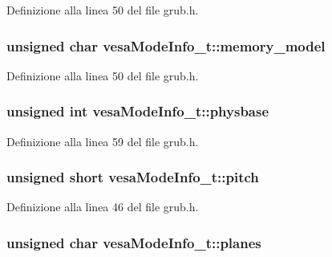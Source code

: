 Definizione alla linea 50 del file grub.\+h.

\hypertarget{structvesaModeInfo__t_a3f6f4827e2c4d40d89a6e8ec6e15c8f4}{
\subsubsection[{memory\+\_\+model}]{\setlength{\rightskip}{0pt plus 5cm}unsigned char vesa\+Mode\+Info\+\_\+t\+::memory\+\_\+model}}\label{structvesaModeInfo__t_a3f6f4827e2c4d40d89a6e8ec6e15c8f4}


Definizione alla linea 50 del file grub.\+h.

\hypertarget{structvesaModeInfo__t_a0233746f9f5f4ecab8622c3a08dc6f5c}{
\subsubsection[{physbase}]{\setlength{\rightskip}{0pt plus 5cm}unsigned int vesa\+Mode\+Info\+\_\+t\+::physbase}}\label{structvesaModeInfo__t_a0233746f9f5f4ecab8622c3a08dc6f5c}


Definizione alla linea 59 del file grub.\+h.

\hypertarget{structvesaModeInfo__t_aed2e5dc0be6bd66efb67ab3de2191bfe}{
\subsubsection[{pitch}]{\setlength{\rightskip}{0pt plus 5cm}unsigned short vesa\+Mode\+Info\+\_\+t\+::pitch}}\label{structvesaModeInfo__t_aed2e5dc0be6bd66efb67ab3de2191bfe}


Definizione alla linea 46 del file grub.\+h.

\hypertarget{structvesaModeInfo__t_a9d1ab189d261e008a41daa04d5ee9693}{
\subsubsection[{planes}]{\setlength{\rightskip}{0pt plus 5cm}unsigned char vesa\+Mode\+Info\+\_\+t\+::planes}}\label{structvesaModeInfo__t_a9d1ab189d261e008a41daa04d5ee9693}


